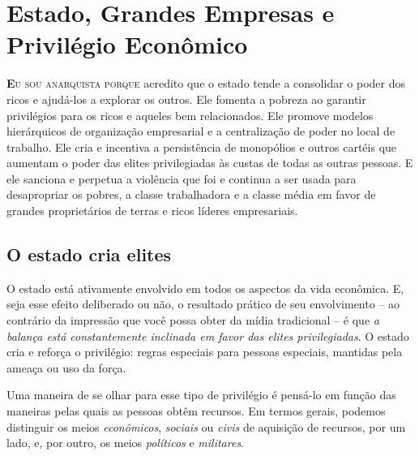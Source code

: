 
\chapter{Estado, Grandes Empresas e Privilégio Econômico}
\label{chap:3}

\lettrine[lines=2]{\textcolor{LettrineColor}{\textbf{E}}}{u sou anarquista porque} acredito que o estado tende a consolidar o poder dos ricos e ajudá-los a explorar os outros. Ele fomenta a pobreza ao garantir privilégios para os ricos e aqueles bem relacionados. Ele promove modelos hierárquicos de organização empresarial e a centralização de poder no local de trabalho. Ele cria e incentiva a persistência de monopólios e outros cartéis que aumentam o poder das elites privilegiadas às custas de todas as outras pessoas. E ele sanciona e perpetua a violência que foi e continua a ser usada para desapropriar os pobres, a classe trabalhadora e a classe média em favor de grandes proprietários de terras e ricos líderes empresariais.

\section{O estado cria elites}

O estado está ativamente envolvido em todos os aspectos da vida econômica. E, seja esse efeito deliberado ou não, o resultado prático de seu envolvimento -- ao contrário da impressão que você possa obter da mídia tradicional -- é que \emph{a balança está constantemente inclinada em favor das elites privilegiadas}. O estado cria e reforça o privilégio: regras especiais para pessoas especiais, mantidas pela ameaça ou uso da força.

Uma maneira de se olhar para esse tipo de privilégio é pensá-lo em função das maneiras pelas quais as pessoas obtêm recursos. Em termos gerais, podemos distinguir os meios \emph{econômicos}, \emph{sociais} ou \emph{civis} de aquisição de recursos, por um lado, e, por outro, os meios \emph{políticos} e \emph{militares}.

